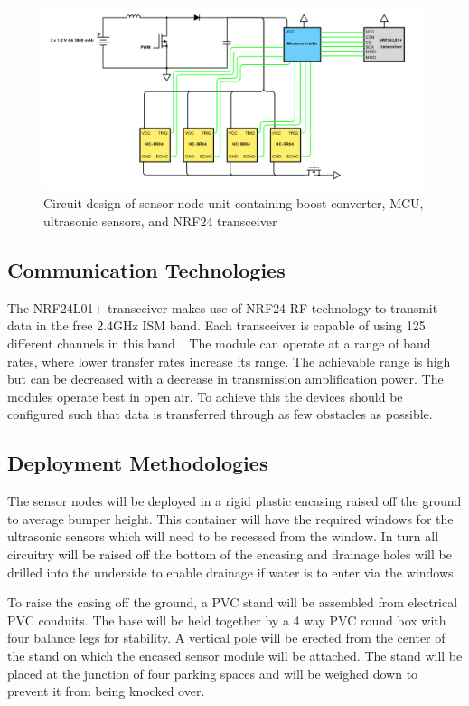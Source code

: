\documentclass[10pt,twocolumn]{witseiepaper}
\begin{document}
		\begin{figure}[h]
			\centering
			\includegraphics[width=\textwidth]{media/node-circuit.png}
			\caption{Circuit design of sensor node unit containing boost converter, MCU, ultrasonic sensors, and NRF24 transceiver}
			\raggedright
			\label{fig:node-circuit}
		\end{figure}
	
	\subsection{Communication Technologies}
		The NRF24L01+ transceiver makes use of NRF24 RF technology to transmit data in the free 2.4GHz ISM band. Each transceiver is capable of using 125 different channels in this band~\cite{howToMech_NRF24L01Tutorial}. The module can operate at a range of baud rates, where lower transfer rates increase its range. The achievable range is high but can be decreased with a decrease in transmission amplification power. The modules operate best in open air. To achieve this the devices should be configured such that data is transferred through as few obstacles as possible. 
	
	\subsection{Deployment Methodologies}
	
		The sensor nodes will be deployed in a rigid plastic encasing raised off the ground to average bumper height. This container will have the required windows for the ultrasonic sensors which will need to be recessed from the window. In turn all circuitry will be raised off the bottom of the encasing and drainage holes will be drilled into the underside to enable drainage if water is to enter via the windows.
		
		To raise the casing off the ground, a PVC stand will be assembled from electrical PVC conduits. The base will be held together by a 4 way PVC round box with four balance legs for stability. A vertical pole will be erected from the center of the stand on which the encased sensor module will be attached. The stand will be placed at the junction of four parking spaces and will be weighed down to prevent it from being knocked over.
	
\end{document}
